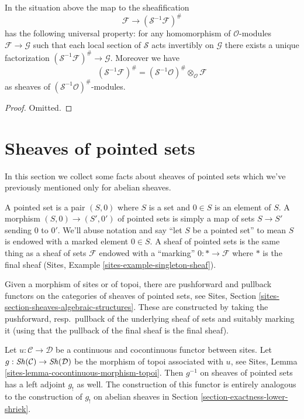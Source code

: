 \begin{lemma}
\label{lemma-simple-invert-module}
In the situation above the map to the sheafification
$$
\mathcal{F} \longrightarrow (\mathcal{S}^{-1}\mathcal{F})^\#
$$
has the following universal property: for any homomorphism
of $\mathcal{O}$-modules $\mathcal{F} \to \mathcal{G}$ such
that each local section of $\mathcal{S}$ acts invertibly on $\mathcal{G}$
there exists a unique factorization
$(\mathcal{S}^{-1}\mathcal{F})^\# \to \mathcal{G}$.
Moreover we have
$$
(\mathcal{S}^{-1}\mathcal{F})^\#
=
(\mathcal{S}^{-1}\mathcal{O})^\# \otimes_\mathcal{O} \mathcal{F}
$$
as sheaves of $(\mathcal{S}^{-1}\mathcal{O})^\#$-modules.
\end{lemma}

\begin{proof}
Omitted.
\end{proof}









\section{Sheaves of pointed sets}
\label{section-pointed}

\noindent
In this section we collect some facts about sheaves of pointed sets
which we've previously mentioned only for abelian sheaves.

\medskip\noindent
A pointed set is a pair $(S, 0)$ where $S$ is a set and $0 \in S$
is an element of $S$. A morphism $(S, 0) \to (S', 0')$ of pointed sets
is simply a map of sets $S \to S'$ sending $0$ to $0'$. We'll abuse
notation and say ``let $S$ be a pointed set'' to mean $S$ is endowed
with a marked element $0 \in S$. A sheaf of pointed sets is
the same thing as a sheaf of sets $\mathcal{F}$ endowed with a
``marking'' $0 : * \to \mathcal{F}$ where $*$ is the final sheaf
(Sites, Example \ref{sites-example-singleton-sheaf}).

\medskip\noindent
Given a morphism of sites or of topoi, there are pushforward
and pullback functors on the categories of sheaves of pointed sets, see
Sites, Section \ref{sites-section-sheaves-algebraic-structures}.
These are constructed by taking the pushforward, resp.\ pullback
of the underlying sheaf of sets and suitably marking it (using
that the pullback of the final sheaf is the final sheaf).

\medskip\noindent
Let $u : \mathcal{C} \to \mathcal{D}$ be a continuous and cocontinuous
functor between sites. Let $g : \mathop{\mathit{Sh}}\nolimits(\mathcal{C}) \to \mathop{\mathit{Sh}}\nolimits(\mathcal{D})$
be the morphism of topoi associated with $u$, see
Sites, Lemma \ref{sites-lemma-cocontinuous-morphism-topoi}.
Then $g^{-1}$ on sheaves of pointed sets has a left adjoint $g_!$
as well. The construction of this functor is entirely analogous to
the construction of $g_!$ on abelian sheaves in
Section \ref{section-exactness-lower-shriek}.

